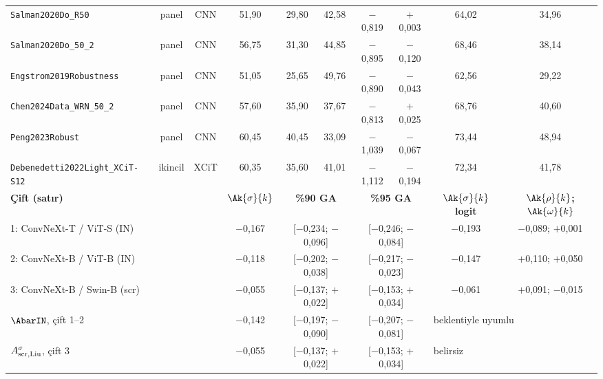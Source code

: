 \begin{table}[!t]
\begin{tabular*}{\textwidth}{@{\extracolsep{\fill}}lccccccccc}
\texttt{Salman2020Do\_R50} & panel & CNN & 51,90 & 29,80 & 42,58 & $-$0,819 & $+$0,003 & 64,02 & 34,96 \\
\texttt{Salman2020Do\_50\_2} & panel & CNN & 56,75 & 31,30 & 44,85 & $-$0,895 & $-$0,120 & 68,46 & 38,14 \\
\texttt{Engstrom2019Robustness} & panel & CNN & 51,05 & 25,65 & 49,76 & $-$0,890 & $-$0,043 & 62,56 & 29,22 \\
\texttt{Chen2024Data\_WRN\_50\_2} & panel & CNN & 57,60 & 35,90 & 37,67 & $-$0,813 & $+$0,025 & 68,76 & 40,60 \\
\texttt{Peng2023Robust} & panel & CNN & 60,45 & 40,45 & 33,09 & $-$1,039 & $-$0,067 & 73,44 & 48,94 \\
\texttt{Debenedetti2022Light\_XCiT-S12} & ikincil & XCiT & 60,35 & 35,60 & 41,01 & $-$1,112 & $-$0,194 & 72,34 & 41,78 \\
\midrule
\multicolumn{3}{l}{\textbf{Çift (satır)}} & \textbf{$\Ak{\sigma}{k}$} & \multicolumn{2}{c}{\textbf{\%90 GA}} & \multicolumn{2}{c}{\textbf{\%95 GA}} & \textbf{$\Ak{\sigma}{k}$ logit} & \textbf{$\Ak{\rho}{k}$; $\Ak{\omega}{k}$} \\
\midrule
\multicolumn{3}{l}{1: ConvNeXt-T / ViT-S (IN)} & $-$0,167 & \multicolumn{2}{c}{[$-$0,234; $-$0,096]} & \multicolumn{2}{c}{[$-$0,246; $-$0,084]} & $-$0,193 & $-$0,089; $+$0,001 \\
\multicolumn{3}{l}{2: ConvNeXt-B / ViT-B (IN)} & $-$0,118 & \multicolumn{2}{c}{[$-$0,202; $-$0,038]} & \multicolumn{2}{c}{[$-$0,217; $-$0,023]} & $-$0,147 & $+$0,110; $+$0,050 \\
\multicolumn{3}{l}{3: ConvNeXt-B / Swin-B (scr)} & $-$0,055 & \multicolumn{2}{c}{[$-$0,137; $+$0,022]} & \multicolumn{2}{c}{[$-$0,153; $+$0,034]} & $-$0,061 & $+$0,091; $-$0,015 \\
\multicolumn{3}{l}{$\AbarIN$, çift 1--2} & $-$0,142 & \multicolumn{2}{c}{[$-$0,197; $-$0,090]} & \multicolumn{2}{c}{[$-$0,207; $-$0,081]} & \multicolumn{2}{l}{beklentiyle uyumlu} \\
\multicolumn{3}{l}{$A^{\sigma}_{\mathrm{scr,Liu}}$, çift 3} & $-$0,055 & \multicolumn{2}{c}{[$-$0,137; $+$0,022]} & \multicolumn{2}{c}{[$-$0,153; $+$0,034]} & \multicolumn{2}{l}{belirsiz} \\
\bottomrule
\end{tabular*}
\end{table}

